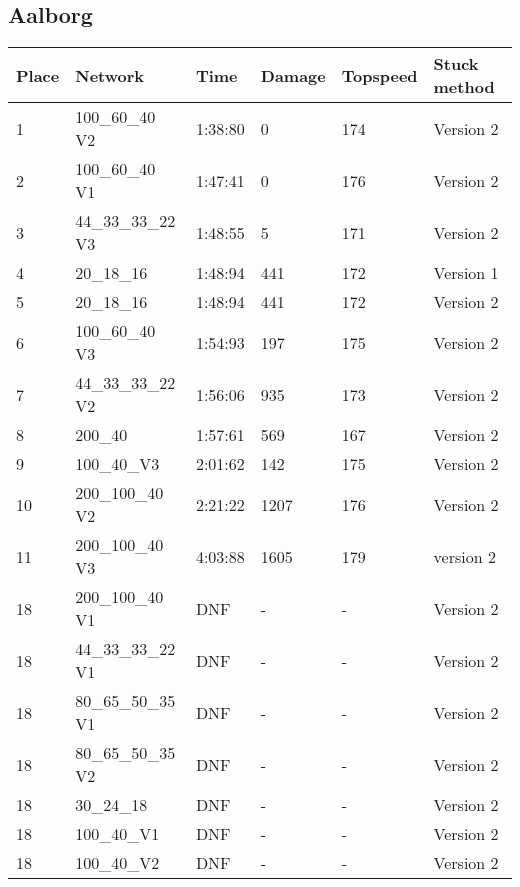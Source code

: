 \documentclass[a4paper,10pt]{scrartcl}
\begin{document}
\subsection*{Aalborg}
\begin{table}[H]
\begin{tabular}{llllll}
 \textbf{Place} & \textbf{Network} & \textbf{Time} & \textbf{Damage} & \textbf{Topspeed}  & \textbf{Stuck method} \\ \hline
 1 & 100\_60\_40 V2  & 1:38:80  & 0 & 174 & Version 2   \\ 
 2 & 100\_60\_40 V1 & 1:47:41 & 0 & 176 & Version 2 \\
 3 & 44\_33\_33\_22 V3  & 1:48:55 & 5 & 171 & Version 2 \\
 4 & 20\_18\_16  & 1:48:94 & 441 & 172 & Version 1 \\
 5 & 20\_18\_16   & 1:48:94 & 441 & 172 & Version 2 \\
 6 & 100\_60\_40 V3 & 1:54:93  & 197 & 175 & Version 2   \\  
 7 & 44\_33\_33\_22 V2  & 1:56:06 & 935 & 173 & Version 2 \\
 8 & 200\_40  &  1:57:61 & 569 & 167 & Version 2 \\ 
 9 & 100\_40\_V3  & 2:01:62 & 142 & 175 & Version 2 \\
 10 & 200\_100\_40 V2  & 2:21:22 & 1207 & 176 & Version 2 \\
 11 & 200\_100\_40 V3 & 4:03:88 & 1605 & 179 & version 2 \\
 18 & 200\_100\_40 V1  & DNF & - & - & Version 2 \\
 18 & 44\_33\_33\_22 V1  & DNF & - & - & Version 2 \\ 
 18 & 80\_65\_50\_35 V1  & DNF & - & - & Version 2 \\
 18 & 80\_65\_50\_35 V2  & DNF & - & - & Version 2 \\
 18 & 30\_24\_18   &  DNF & - & - & Version 2 \\
 18 & 100\_40\_V1  & DNF & - & - & Version 2 \\
 18 & 100\_40\_V2 & DNF & - & - & Version 2 \\
\end{tabular}
\end{table}
\end{document}

